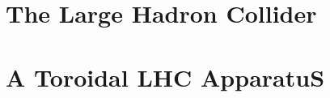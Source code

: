 
\section{The \textbf{L}arge \textbf{H}adron \textbf{C}ollider}

\section{\textbf{A} \textbf{T}oroidal \textbf{L}HC \textbf{A}pparatu\textbf{S}}
